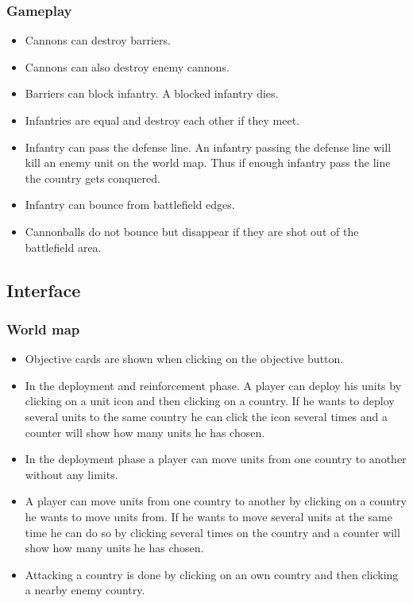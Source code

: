 \documentclass[12pt,a4paper]{article}
\begin{document}
\subsubsection{Gameplay}
\begin{itemize}
\item Cannons can destroy barriers.
\item Cannons can also destroy enemy cannons.
\item Barriers can block infantry. A blocked infantry dies.
\item Infantries are equal and destroy each other if they meet.
\item Infantry can pass the defense line. An infantry passing the defense
  line will kill an enemy unit on the world map. Thus if enough
  infantry pass the line the country gets conquered.
\item Infantry can bounce from battlefield edges. 
\item Cannonballs do not bounce but disappear if they are shot out of
  the battlefield area.
\end{itemize}

\subsection{Interface}

\subsubsection{World map}

\begin{itemize}
\item Objective cards are shown when clicking on the objective button.
\item In the deployment and reinforcement phase. A player can deploy
  his units by clicking on a unit icon and then clicking on a
  country. If he wants to deploy several units to the same country he
  can click the icon several times and a counter will show how many
  units he has chosen.
\item In the deployment phase a player can move units from one country
  to another without any limits.
\item A player can move units from one country to another by clicking
  on a country he wants to move units from. If he wants to move
  several units at the same time he can do so by clicking several
  times on the country and a counter will show how many units he has
  chosen.
\item Attacking a country is done by clicking on an own country and
  then clicking a nearby enemy country.
\end{itemize}
\end{document}
